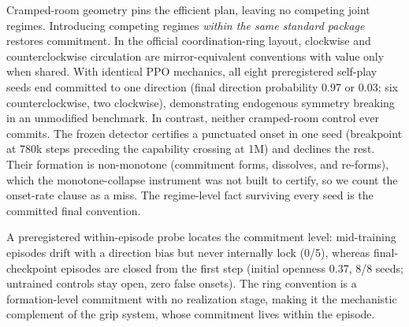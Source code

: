 \documentclass[11pt]{article}
\begin{document}
Cramped-room geometry pins the efficient plan, leaving no competing
joint regimes. Introducing competing regimes \emph{within the same
standard package} restores
commitment. In the official coordination-ring layout, clockwise and
counterclockwise circulation are mirror-equivalent conventions with
value only when shared. With identical PPO mechanics, all eight
preregistered self-play seeds end committed to one direction (final
direction probability 0.97 or 0.03; six counterclockwise, two
clockwise), demonstrating endogenous symmetry breaking in an unmodified
benchmark. In contrast, neither cramped-room control ever commits. The
frozen detector certifies a punctuated onset in one seed (breakpoint
at 780k steps preceding the capability crossing at 1M) and declines
the rest. Their formation is non-monotone (commitment forms,
dissolves, and re-forms), which the monotone-collapse instrument was
not built to certify, so we count the onset-rate clause as a miss. The
regime-level fact surviving every seed is the committed final
convention.

A preregistered within-episode probe locates the
commitment level: mid-training episodes drift with a direction bias
but never internally lock (0/5), whereas final-checkpoint episodes are
closed from the first step (initial openness 0.37, 8/8 seeds;
untrained controls stay open, zero false onsets). The ring convention
is a formation-level commitment with no realization stage, making it
the mechanistic complement of the grip system, whose commitment lives
within the episode.
\end{document}
